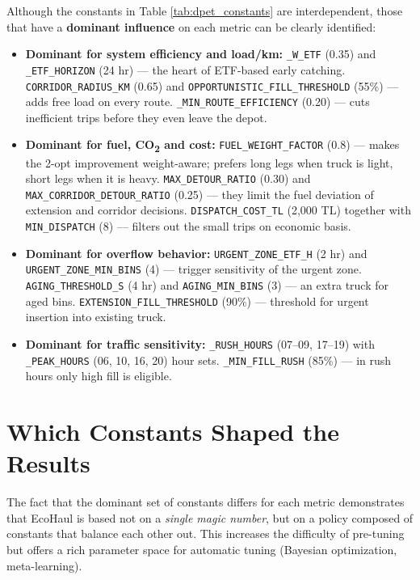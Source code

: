 \documentclass[12pt,a4paper]{report}
\begin{document}
\begin{itemize}[leftmargin=*]
\indent Although the constants in Table \ref{tab:dpet_constants} are interdependent, those that have a \textbf{dominant influence} on each metric can be clearly identified:

\begin{itemize}[leftmargin=*]
  \item \textbf{Dominant for system efficiency and load/km:}
    \texttt{\_W\_ETF} (0.35) and \texttt{\_ETF\_HORIZON} (24 hr) --- the heart of ETF-based early catching.
    \texttt{CORRIDOR\_RADIUS\_KM} (0.65) and \texttt{OPPORTUNISTIC\_FILL\_THRESHOLD} (55\%) --- adds free load on every route.
    \texttt{\_MIN\_ROUTE\_EFFICIENCY} (0.20) --- cuts inefficient trips before they even leave the depot.
  \item \textbf{Dominant for fuel, CO\textsubscript{2} and cost:}
    \texttt{FUEL\_WEIGHT\_FACTOR} (0.8) --- makes the 2-opt improvement weight-aware; prefers long legs when truck is light, short legs when it is heavy.
    \texttt{MAX\_DETOUR\_RATIO} (0.30) and \texttt{MAX\_CORRIDOR\_DETOUR\_RATIO} (0.25) --- they limit the fuel deviation of extension and corridor decisions.
    \texttt{DISPATCH\_COST\_TL} (2,000 TL) together with \texttt{MIN\_DISPATCH} (8) --- filters out the small trips on economic basis.
  \item \textbf{Dominant for overflow behavior:}
    \texttt{URGENT\_ZONE\_ETF\_H} (2 hr) and \texttt{URGENT\_ZONE\_MIN\_BINS} (4) --- trigger sensitivity of the urgent zone.
    \texttt{AGING\_THRESHOLD\_S} (4 hr) and \texttt{AGING\_MIN\_BINS} (3) --- an extra truck for aged bins.
    \texttt{EXTENSION\_FILL\_THRESHOLD} (90\%) --- threshold for urgent insertion into existing truck.
  \item \textbf{Dominant for traffic sensitivity:}
    \texttt{\_RUSH\_HOURS} (07--09, 17--19) with \texttt{\_PEAK\_HOURS} (06, 10, 16, 20) hour sets.
    \texttt{\_MIN\_FILL\_RUSH} (85\%) --- in rush hours only high fill is eligible.
\end{itemize}


\section{Which Constants Shaped the Results}
\label{sec:which_constants}

\indent The fact that the dominant set of constants differs for each metric demonstrates that EcoHaul is based not on a \textit{single magic number}, but on a policy composed of constants that balance each other out. This increases the difficulty of pre-tuning but offers a rich parameter space for automatic tuning (Bayesian optimization, meta-learning).


\end{itemize}
\end{document}
